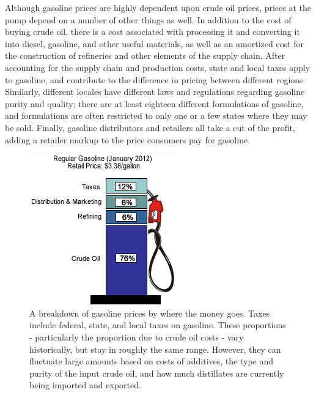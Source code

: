 \documentclass[11pt,twocolumn]{article}
\newcommand{\tab}[0] {\hspace*{24pt}}
\begin{document}
\tab Although gasoline prices are highly dependent upon crude oil prices, prices at the pump depend on a number of other things as well. In addition to the cost of buying crude oil, there is a cost associated with processing it and converting it into diesel, gasoline, and other useful materials, as well as an amortized cost for the construction of refineries and other elements of the supply chain. After accounting for the supply chain and production costs, state and local taxes apply to gasoline, and contribute to the difference in pricing between different regions. Similarly, different locales have different laws and regulations regarding gasoline purity and quality; there are at least eighteen different formulations of gasoline, and formulations are often restricted to only one or a few states where they may be sold.  Finally, gasoline distributors and retailers all take a cut of the profit, adding a retailer markup to the price consumers pay for gasoline. 
\begin{figure}
    \centering
    \includegraphics[scale=1.0]{images/GasolineDollarBreakdown.png}\\
A breakdown of gasoline prices by where the money goes. Taxes include federal,
state, and local taxes on gasoline. These proportions - particularly the
proportion due to crude oil costs - vary historically, but stay in roughly the
same range. However, they can fluctuate large amounts based on costs of
additives, the type and purity of the input crude oil, and how much distillates
are currently being imported and exported.
\end{figure}
\end{document}
